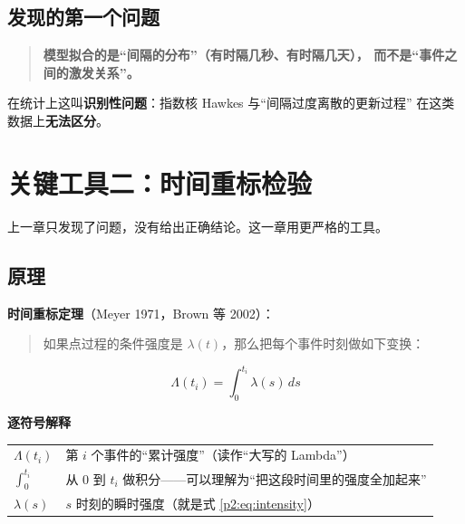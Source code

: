 \documentclass[UTF8,a4paper,11pt]{ctexart}
\newenvironment{explainbox}[1]
{\begin{center}\begin{minipage}{0.94\textwidth}\colorbox{boxbg}{\parbox{0.92\textwidth}{\textbf{#1}\par\vspace{2pt}}}}
{\end{minipage}\end{center}}
\newcommand{\term}[1]{\textbf{#1}}
\begin{document}
\subsection{发现的第一个问题}

\begin{quote}
\textbf{模型拟合的是“间隔的分布”（有时隔几秒、有时隔几天），
而不是“事件之间的激发关系”。}
\end{quote}

在统计上这叫\term{识别性问题}：指数核 Hawkes 与“间隔过度离散的更新过程”
在这类数据上\textbf{无法区分}。

\newpage


\section{关键工具二：时间重标检验}

上一章只发现了问题，没有给出正确结论。这一章用更严格的工具。

\subsection{原理}

\term{时间重标定理}（Meyer 1971，Brown 等 2002）：

\begin{quote}
如果点过程的条件强度是 $\lambda(t)$，那么把每个事件时刻做如下变换：
\end{quote}

\begin{equation}
\Lambda(t_i) = \int_0^{t_i} \lambda(s)\, ds
\label{p2:eq:compensator}
\end{equation}

\begin{explainbox}{逐符号解释}
\begin{longtable}{@{}p{2.4cm}p{11.4cm}@{}}
$\Lambda(t_i)$ & 第 $i$ 个事件的“累计强度”（读作“大写的 Lambda”） \\
$\int_0^{t_i}$ & 从 0 到 $t_i$ 做积分——可以理解为“把这段时间里的强度全加起来” \\
$\lambda(s)$ & $s$ 时刻的瞬时强度（就是式 \eqref{p2:eq:intensity}） \\
\end{longtable}
\end{explainbox}
\end{document}
